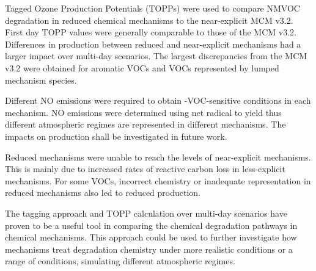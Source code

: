 Tagged Ozone Production Potentials (TOPPs) were used to compare NMVOC degradation in reduced chemical mechanisms to the near-explicit MCM v3.2. 
First day TOPP values were generally comparable to those of the MCM v3.2.
Differences in  production between reduced and near-explicit mechanisms had a larger impact over multi-day scenarios.  
The largest discrepancies from the MCM v3.2 were obtained for aromatic VOCs and VOCs represented by lumped mechanism species.

Different NO emissions were required to obtain -VOC-sensitive conditions in each mechanism.
NO emissions were determined using net radical to  yield thus different atmospheric regimes are represented in different mechanisms.
The impacts on  production shall be investigated in future work.

Reduced mechanisms were unable to reach the  levels of near-explicit mechanisms.
This is mainly due to increased rates of reactive carbon loss in less-explicit mechanisms.
For some VOCs, incorrect chemistry or inadequate representation in reduced mechanisms also led to reduced  production.

The tagging approach and TOPP calculation over multi-day scenarios have proven to be a useful tool in comparing the chemical degradation pathways in chemical mechanisms. 
This approach could be used to further investigate how mechanisms treat degradation chemistry under more realistic  conditions or a range of  conditions, simulating different atmospheric regimes. 
